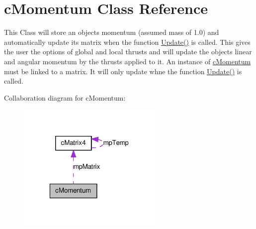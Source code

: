 \hypertarget{classc_momentum}{
\section{cMomentum Class Reference}
\label{classc_momentum}
}


This Class will store an objects momentum (assumed mass of 1.0) and automatically update its matrix when the function \hyperlink{classc_momentum_ae860280e817e7afef71222afd0b12ec8}{Update()} is called. This gives the user the options of global and local thrusts and will update the objects linear and angular momentum by the thrusts applied to it. An instance of \hyperlink{classc_momentum}{cMomentum} must be linked to a matrix. It will only update whne the function \hyperlink{classc_momentum_ae860280e817e7afef71222afd0b12ec8}{Update()} is called.  




Collaboration diagram for cMomentum:\nopagebreak
\begin{figure}[H]
\begin{center}
\leavevmode
\includegraphics[width=199pt]{classc_momentum__coll__graph}
\end{center}
\end{figure}
